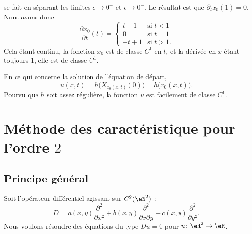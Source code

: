 \begin{example}
    se fait en séparant les limites \( \epsilon\to 0^+\) et \( \epsilon\to 0^-\). Le résultat est que \( \partial_tx_0(1)=0\). Nous avons donc
    \begin{equation}
        \frac{ \partial x_0 }{ \partial t }(t)=\begin{cases}
            t-1    &   \text{si } t<1\\
            0    &    \text{si } t=1\\
            -t+1    &    \text{si }t>1.
        \end{cases}
    \end{equation}
    Cela étant continu, la fonction \( x_0\) est de classe \( C^1\) en \( t\), et la dérivée en \( x\) étant toujours \( 1\), elle est de classe \( C^1\).

    En ce qui concerne la solution de l'équation de départ,
    \begin{equation}
        u(x,t)=h\big( X_{x_0(x,t)}(0) \big)=h\big( x_0(x,t) \big).
    \end{equation}
    Pourvu que \( h\) soit assez régulière, la fonction \( u\) est facilement de classe \( C^1\).
\end{example}

\section{Méthode des caractéristique pour l'ordre \( 2\)}

\subsection{Principe général}

Soit l'opérateur différentiel agissant sur \( C^2(\eR^2)\) :
\begin{equation}
    D=a(x,y)\frac{ \partial^2 }{ \partial x^2 }+b(x,y)\frac{ \partial^2 }{ \partial x\partial y }+c(x,y)\frac{ \partial^2 }{ \partial y^2 }.
\end{equation}
Nous voulons résoudre des équations du type \( Du=0\) pour \( u\colon \eR^2\to \eR\).


